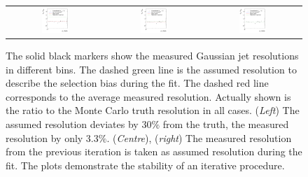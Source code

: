 


\begin{figure}[ht]
  \centering
    \begin{tabular}{ccc}
      \includegraphics[width=0.3\textwidth]{figures/ResFit_Spring10QCDFlat_GaussUp30It0_Eta0_ExtrapolatedResolutionRatio} &
      \includegraphics[width=0.3\textwidth]{figures/ResFit_Spring10QCDFlat_GaussUp30It1_Eta0_ExtrapolatedResolutionRatio} &
      \includegraphics[width=0.3\textwidth]{figures/ResFit_Spring10QCDFlat_GaussUp30It2_Eta0_ExtrapolatedResolutionRatio}
    \end{tabular}
  \caption{The solid black markers show the measured Gaussian jet \pt resolutions in different \pt bins.
  The dashed green line is the assumed resolution to describe the selection bias during the fit.
  The dashed red line corresponds to the average measured resolution.
  Actually shown is the ratio to the Monte Carlo truth resolution in all cases.
  (\textit{Left}) The assumed resolution deviates by $30\%$ from the truth, the measured resolution by only $3.3\%$.
  (\textit{Centre}), (\textit{right}) The measured resolution from the previous iteration is taken as assumed resolution during the fit.
  The plots demonstrate the stability of an iterative procedure.}
  \label{fig:ResFig:QCD:Extrapolation:Gauss:Iterations}
\end{figure}

